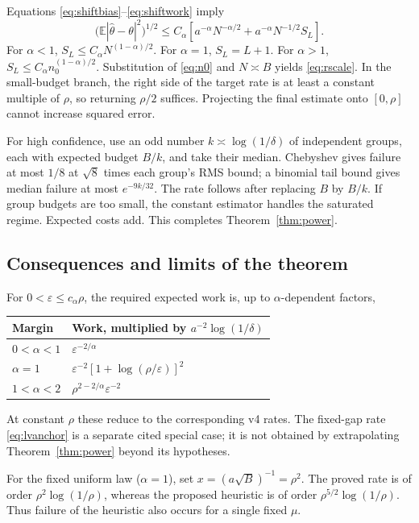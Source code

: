 \documentclass[11pt]{article}
\theoremstyle{definition}\newtheorem{conjecture}[theorem]{Conjecture}
\theoremstyle{remark}\newtheorem{remark}[theorem]{Remark}
\newcommand{\E}{\mathbb E}\newcommand{\PP}{\mathbb P}\newcommand{\R}{\mathbb R}
\begin{document}
Equations \eqref{eq:shiftbias}--\eqref{eq:shiftwork} imply
\begin{equation}\label{eq:upperwork}
 \bigl(\E|\widehat\theta-\theta|^2\bigr)^{1/2}
 \le C_\alpha\left[a^{-\alpha}N^{-\alpha/2}
       +a^{-\alpha}N^{-1/2}S_L\right].
\end{equation}
For $\alpha<1$, $S_L\le C_\alpha N^{(1-\alpha)/2}$. For $\alpha=1$, $S_L=L+1$. For $\alpha>1$, $S_L\le C_\alpha n_0^{(1-\alpha)/2}$. Substitution of \eqref{eq:n0} and $N\asymp B$ yields \eqref{eq:rscale}. In the small-budget branch, the right side of the target rate is at least a constant multiple of $\rho$, so returning $\rho/2$ suffices. Projecting the final estimate onto $[0,\rho]$ cannot increase squared error.

For high confidence, use an odd number $k\asymp\log(1/\delta)$ of independent groups, each with expected budget $B/k$, and take their median. Chebyshev gives failure at most $1/8$ at $\sqrt8$ times each group's RMS bound; a binomial tail bound gives median failure at most $e^{-9k/32}$. The rate follows after replacing $B$ by $B/k$. If group budgets are too small, the constant estimator handles the saturated regime. Expected costs add. This completes Theorem~\ref{thm:power}.

\subsection{Consequences and limits of the theorem}
For $0<\varepsilon\le c_\alpha\rho$, the required expected work is, up to $\alpha$-dependent factors,
\begin{center}\begin{tabular}{ll}\toprule
Margin & Work, multiplied by $a^{-2}\log(1/\delta)$\\\midrule
$0<\alpha<1$ & $\varepsilon^{-2/\alpha}$\\
$\alpha=1$ & $\varepsilon^{-2}[1+\log(\rho/\varepsilon)]^2$\\
$1<\alpha<2$ & $\rho^{2-2/\alpha}\varepsilon^{-2}$\\\bottomrule
\end{tabular}\end{center}
At constant $\rho$ these reduce to the corresponding v4 rates. The fixed-gap rate \eqref{eq:lvanchor} is a separate cited special case; it is not obtained by extrapolating Theorem~\ref{thm:power} beyond its hypotheses.

For the fixed uniform law ($\alpha=1$), set $x=(a\sqrt B)^{-1}=\rho^2$. The proved rate is of order $\rho^2\log(1/\rho)$, whereas the proposed heuristic is of order $\rho^{5/2}\log(1/\rho)$. Thus failure of the heuristic also occurs for a single fixed $\mu$.
\end{document}
